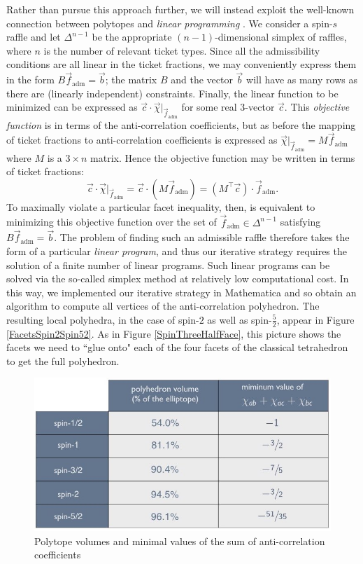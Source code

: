 Rather than pursue this approach further, we will instead exploit the well-known connection between polytopes and \emph{linear programming} \citep{Dantzig and Thapa 1997, Dantzig and Thapa 2003}. We consider a spin-$s$ raffle and let $\Delta^{n-1}$ be the appropriate $(n-1)$-dimensional simplex of raffles, where $n$ is the number of relevant ticket types. Since all the admissibility conditions are all linear in the ticket fractions, we may conveniently express them in the form $B\vec{f}_{\mathrm{adm}}=\vec{b}$; the matrix $B$ and the vector $\vec{b}$ will have as many rows as there are (linearly independent) constraints. Finally, the linear function to be minimized can be expressed as $\vec{c}\cdot \vec{\chi}|_{\vec{f}_{\mathrm{adm}}}$ for some real 3-vector $\vec{c}$. This \emph{objective function} is in terms of the anti-correlation coefficients, but as before the mapping of ticket fractions to anti-correlation coefficients is expressed as $\vec{\chi}|_{\vec{f}_{\mathrm{adm}}}=M\vec{f}_{\mathrm{adm}}$ where $M$ is a $3\times n$ matrix. Hence the objective function may be written in terms of ticket fractions:
\begin{equation}
    \vec{c}\cdot \vec{\chi}|_{\vec{f}_{\mathrm{adm}}}=\vec{c}\cdot (M\vec{f}_{\mathrm{adm}})=(M^\top \vec{c})\cdot \vec{f}_{\mathrm{adm}}.
\end{equation}
To maximally violate a particular facet inequality, then, is equivalent to minimizing this objective function over the set of $\vec{f}_{\mathrm{adm}}\in \Delta^{n-1}$ satisfying $B\vec{f}_{\mathrm{adm}}=\vec{b}$. The problem of finding such an admissible raffle therefore takes the form of a particular \emph{linear program},  and thus our iterative strategy requires the solution of a finite number of linear programs. Such linear programs can be solved via the so-called simplex method at relatively low computational cost. In this way, we implemented our iterative strategy in Mathematica and so obtain an algorithm to compute all vertices of the anti-correlation polyhedron. The resulting local polyhedra, in the case of spin-$2$ as well as spin-$\frac52$, appear in Figure \ref{FacetsSpin2Spin52}. As in Figure \ref{SpinThreeHalfFace}, this picture shows the facets we need to ``glue onto" each of the four facets of the classical tetrahedron to get the full polyhedron.

\begin{figure}[h]
 \centering
   \includegraphics[width=5in]{polytopevolume.jpeg} 
   \caption{Polytope volumes and minimal values of the sum of anti-correlation coefficients}
   \label{polytopevolume}
\end{figure}

